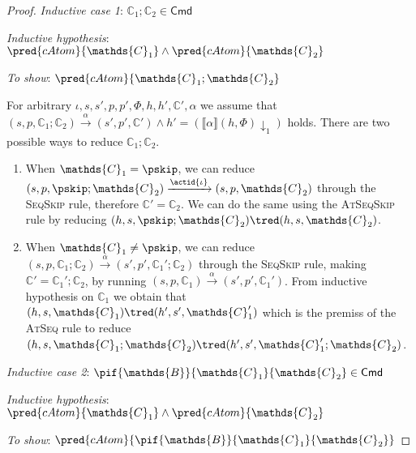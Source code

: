 \begin{lem}
{\begin{proof}
	\textit{Inductive case 1}: $\mathds{C}_1 ; \mathds{C}_2 \in \mathsf{Cmd}$
	
	\textit{Inductive hypothesis}: $\pred{cAtom}{\mathds{C}_1} \land \pred{cAtom}{\mathds{C}_2}$
	
	\textit{To show}: $\pred{cAtom}{\mathds{C}_1 ; \mathds{C}_2}$
	
	For arbitrary $\iota, s, s', p, p', \Phi, h, h', \mathds{C}', \alpha$ we assume that $(s, p, \mathds{C}_1 ; \mathds{C}_2) \xrightarrow{\alpha} (s', p', \mathds{C}') \land h' = \left( \llbracket \alpha \rrbracket(h, \Phi) \downarrow_1 \right)$ holds. There are two possible ways to reduce $\mathds{C}_1 ; \mathds{C}_2$.
	\begin{enumerate}
	\item When $\mathds{C}_1 = \pskip$, we can reduce $(s, p, \pskip ; \mathds{C}_2) \xrightarrow{\actid{\iota}} (s, p, \mathds{C}_2)$ through the \textsc{SeqSkip} rule, therefore $\mathds{C}' = \mathds{C}_2$. We can do the same using the \textsc{AtSeqSkip} rule by reducing $(h, s, \pskip ; \mathds{C}_2) \tred (h, s, \mathds{C}_2)$.
	\item When $\mathds{C}_1 \neq \pskip$, we can reduce $(s, p, \mathds{C}_1 ; \mathds{C}_2) \xrightarrow{\alpha} (s', p', \mathds{C}_1' ; \mathds{C}_2)$ through the \textsc{SeqSkip} rule, making $\mathds{C}' = \mathds{C}_1'; \mathds{C}_2$, by running $(s, p, \mathds{C}_1) \xrightarrow{\alpha} (s', p', \mathds{C}_1')$. From inductive hypothesis on $\mathds{C}_1$ we obtain that $(h, s, \mathds{C}_1) \tred (h', s', \mathds{C}_1')$ which is the premiss of the \textsc{AtSeq} rule to reduce $(h, s, \mathds{C}_1 ; \mathds{C}_2) \tred (h', s', \mathds{C}_1' ; \mathds{C}_2)$. \\
	\end{enumerate}
	
	\textit{Inductive case 2}: $\pif{\mathds{B}}{\mathds{C}_1}{\mathds{C}_2} \in \mathsf{Cmd}$
	
	\textit{Inductive hypothesis}: $\pred{cAtom}{\mathds{C}_1} \land \pred{cAtom}{\mathds{C}_2}$
	
	\textit{To show}: $\pred{cAtom}{\pif{\mathds{B}}{\mathds{C}_1}{\mathds{C}_2}}$
	

\end{proof}}
\end{lem}
